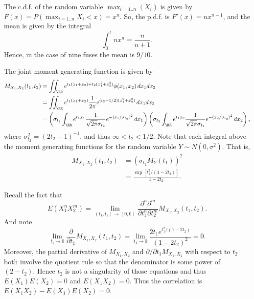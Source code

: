 \documentclass{homework}
\begin{document}

\begin{solution}
  The c.d.f. of the random variable $\max_{i=1..n}(X_i)$ is given by $F(x)=P\left(\max_{i=1..n} X_i < x\right) = x^n$. So, the p.d.f. is $F'(x) = n x^{n-1}$, and the mean is given by the integral
  $$
    \int_0^1 n x^{n} = \frac{n}{n+1}.
  $$
  Hence, in the case of nine fuses the mean is $9/10$.
\end{solution}

\newpage



\begin{solution}
The joint moment generating function is given by
\begin{align*}
  M_{X_1,X_2}(t_1,t_2) 
  &= \iint_{\RR} e^{t_1(x_1 + x_2) + t_2(x_1^2 + x_2^2)} \phi(x_1,x_2) \,dx_1dx_2 \\
  &=\iint_{\RR} e^{t_1(x_1 + x_2)} \frac 1{2\pi} e^{(t_2 - 1/2)(x_1^2 + x_2^2)} \, dx_1dx_2 \\
  &=\left(\sigma_{t_2}\int_\RR e^{t_1 x_1}  \frac {1}{\sqrt{2\pi}\sigma_{t_2}} e^{-(x_1/\sigma_{t_2})^2}\,dx_1\right)
  \left(\sigma_{t_2}\int_\RR e^{t_1 x_2}  \frac {1}{\sqrt{2\pi}\sigma_{t_2}} e^{-(x_2/\sigma_{t_2})^2}\,dx_2 \right),
\end{align*}
  where $\sigma_{t_2}^2 = (2t_2 - 1)^{-1}$, and thus $\infty < t_2 < 1/2$. Note that each integral above the moment generating functions for the random variable $Y\sim N(0,\sigma^2)$.  That is,
  \begin{align*}
  M_{X_1,X_2}(t_1,t_2) 
   &=(\sigma_{t_2} M_Y(t_1))^2\\
   &= \frac{\exp\left[t_1^2/(1-2t_2)\right]}{1-2t_2}.
  \end{align*}

\end{solution}


\begin{solution}
  Recall the fact that
    $$E\left(X_1^n X_2^m\right) = \lim_{(t_1,t_2)\to(0,0)}\frac{\partial^n\partial^m}{\partial t_1^n \partial t_2^m} M_{X_1,X_2}(t_1,t_2).$$
  And note 
  $$
    \lim_{t_1\to0} \frac{\partial}{\partial t_1} M_{X_1,X_2}(t_1,t_2) = \lim_{t_1\to0} \frac{2 t_1 e^{t_1^2/(1-2t_2)}}{(1-2t_2)^2} =0.
  $$ 
  Moreover, the partial derivative of $M_{X_1,X_2}$ and $\partial/\partial t_1 M_{X_1,X_2}$ with respect to $t_2$ both involve the quotient rule so that the denominator is some power of $(2-t_2)$.  Hence $t_2$ is not a singularity of those equations and thus $E(X_1)E(X_2) = 0$ and $E(X_1 X_2) = 0$. Thus the correlation is $E(X_1 X_2) - E(X_1) E(X_2) = 0$.
\end{solution}
\end{document}

